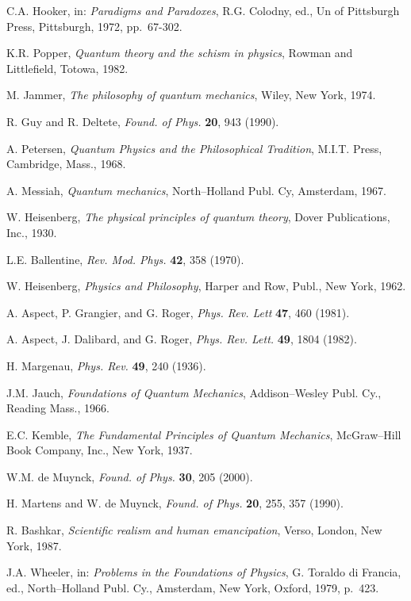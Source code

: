 \documentclass[12pt]{article}
\begin{document}
\begin{thebibliography}{10}
{C.A. Hooker, in: {\em Paradigms and Paradoxes}, R.G. Colodny, ed., Un of
  Pittsburgh Press, Pittsburgh, 1972, pp.~67-302.}

{K.R. Popper, {\em Quantum theory and the schism in physics}, Rowman and
  Littlefield, Totowa, 1982.}

{M. Jammer, {\em The philosophy of quantum mechanics}, Wiley, New York, 1974.}

{R. Guy and R. Deltete, {\em Found. of Phys.} {\bf 20}, 943 (1990).}

{A. Petersen, {\em Quantum Physics and the Philosophical Tradition}, M.I.T.
  Press, Cambridge, Mass., 1968.}

{A. Messiah, {\em Quantum mechanics}, North--Holland Publ. Cy, Amsterdam,
  1967.}

{W. Heisenberg, {\em The physical principles of quantum theory}, Dover
  Publications, Inc., 1930.}

{L.E. Ballentine, {\em Rev. Mod. Phys.} {\bf 42}, 358 (1970).}

{W. Heisenberg, {\em Physics and Philosophy}, Harper and Row, Publ., New York,
  1962.}

{A. Aspect, P. Grangier, and G. Roger, {\em Phys. Rev. Lett} {\bf 47}, 460
  (1981).}

{A. Aspect, J. Dalibard, and G. Roger, {\em Phys. Rev. Lett.} {\bf 49}, 1804
  (1982).}

{H. Margenau, {\em Phys. Rev.} {\bf 49}, 240 (1936).}

{J.M. Jauch, {\em Foundations of Quantum Mechanics}, Addison--Wesley Publ. Cy.,
  Reading Mass., 1966.}

{E.C. Kemble, {\em The Fundamental Principles of Quantum Mechanics},
  McGraw--Hill Book Company, Inc., New York, 1937.}

{W.M. de Muynck, {\em Found. of Phys.} {\bf 30}, 205 (2000).}

{H. Martens and W. de Muynck, {\em Found. of Phys.} {\bf 20}, 255, 357 (1990).}

{R. Bashkar, {\em Scientific realism and human emancipation}, Verso, London,
  New York, 1987.}

{J.A. Wheeler, in: {\em Problems in the Foundations of Physics}, G. Toraldo di
  Francia, ed., North--Holland Publ. Cy., Amsterdam, New York, Oxford, 1979,
  p.~423.}


\end{thebibliography}
\end{document}
